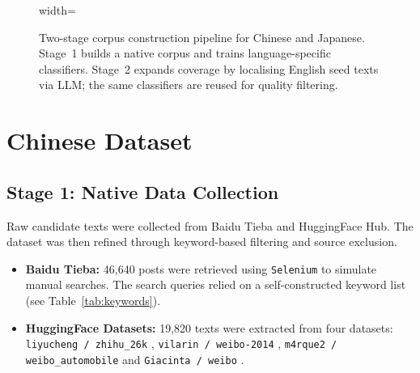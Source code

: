 \documentclass[../CLthesis.tex]{subfiles}
\begin{document}
\begin{figure}[htbp]
\begin{adjustbox}{width=\textwidth}
\end{adjustbox}
\caption{Two-stage corpus construction pipeline for Chinese and Japanese. Stage~1 builds a native corpus and trains language-specific classifiers. Stage~2 expands coverage by localising English seed texts via LLM; the same classifiers are reused for quality filtering.}
\label{fig:pipeline}
\end{figure}


\section{Chinese Dataset}
\label{sec:zh-data}

\subsection{Stage 1: Native Data Collection}
\label{subsec:zh-native}

Raw candidate texts were collected from Baidu Tieba and HuggingFace Hub. The dataset was then refined through keyword-based filtering and source exclusion.

\begin{itemize}
    \item \textbf{Baidu Tieba:} 46,640 posts were retrieved using \texttt{Selenium} \citep{selenium2014} to simulate manual searches. The search queries relied on a self-constructed keyword list (see Table~\ref{tab:keywords}).
    \item \textbf{HuggingFace Datasets:} 19,820 texts were extracted from four datasets: \texttt{liyucheng / zhihu\_26k} \citep{hf_zhihu_26k}, \texttt{vilarin / weibo-2014} \citep{hf_weibo_2014}, \texttt{m4rque2 / \allowbreak weibo\_automobile} \citep{hf_weibo_automobile} and \texttt{Giacinta / weibo} \citep{hf_weibo_giacinta}.
\end{itemize}
\end{document}
